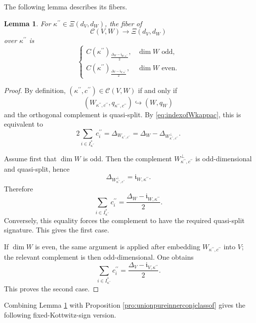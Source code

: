 \documentclass[12pt]{amsart}
\numberwithin{equation}{subsection}
\newcommand{\CC}{{\mathcal {C}}}
\newcommand{\Fi}{{\mathfrak {i}}}
\def\Del{{\Delta}}
\def\p{\prime}
\newtheorem{lem}[thm]{Lemma}
\begin{document}
The following lemma describes its fibers.

\begin{lem}\label{lem:fiberoverkappapp}
For $\kappa^{\p\p}\in \Xi(d_V,d_W)$, the fiber of
\[
\CC(V,W)\longrightarrow \Xi(d_V,d_W)
\]
over $\kappa^{\p\p}$ is
\[
\begin{cases}
C(\kappa^{\p\p})_{\frac{\Del_W-\Fi_{W,\kappa^{\p\p}}}{2}},
& \dim W \text{ odd},\\[4pt]
C(\kappa^{\p\p})_{\frac{\Del_V-\Fi_{V,\kappa^{\p\p}}}{2}},
& \dim W \text{ even}.
\end{cases}
\]
\end{lem}

\begin{proof}
By definition, $(\kappa^{\p\p},c^{\p\p})\in \CC(V,W)$ if and only if
\[
(W_{\kappa^{\p\p},c^{\p\p}},q_{\kappa^{\p\p},c^{\p\p}})
\hookrightarrow (W,q_W)
\]
and the orthogonal complement is quasi-split. By \eqref{eq:indexofWkappac},
this is equivalent to
\[
2\sum_{i\in I^*_{\kappa^{\p\p}}}c_i^{\p\p}
=
\Del_{W_{\kappa^{\p\p},c^{\p\p}}}
=
\Del_W-\Del_{W^\perp_{\kappa^{\p\p},c^{\p\p}}}.
\]

Assume first that $\dim W$ is odd. Then the complement
$W^\perp_{\kappa^{\p\p},c^{\p\p}}$ is odd-dimensional and quasi-split, hence
\[
\Del_{W^\perp_{\kappa^{\p\p},c^{\p\p}}}
=
\Fi_{W,\kappa^{\p\p}}.
\]
Therefore
\[
\sum_{i\in I^*_{\kappa^{\p\p}}}c_i^{\p\p}
=
\frac{\Del_W-\Fi_{W,\kappa^{\p\p}}}{2}.
\]
Conversely, this equality forces the complement to have the required
quasi-split signature. This gives the first case.

If $\dim W$ is even, the same argument is applied after embedding
$W_{\kappa^{\p\p},c^{\p\p}}$ into $V$; the relevant complement is then
odd-dimensional. One obtains
\[
\sum_{i\in I^*_{\kappa^{\p\p}}}c_i^{\p\p}
=
\frac{\Del_V-\Fi_{V,\kappa^{\p\p}}}{2}.
\]
This proves the second case.
\end{proof}

Combining Lemma \ref{lem:fiberoverkappapp} with Proposition
\ref{pro:unionpureinnerconjclassof} gives the following fixed-Kottwitz-sign
version.
\end{document}
